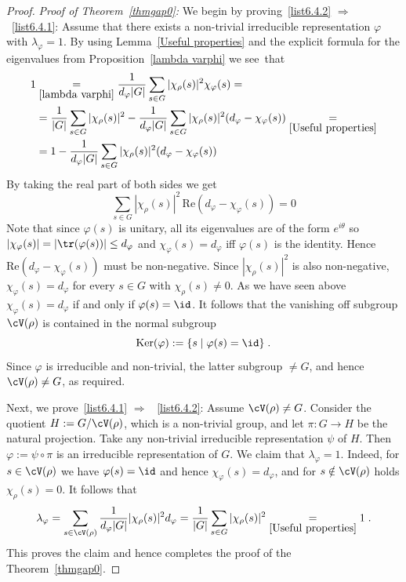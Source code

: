 \begin{proof}\emph{Proof of Theorem~\ref{thmgap0}:}
We begin by proving~\eqref{list6.4.2} $\Rightarrow$~\eqref{list6.4.1}: Assume that there exists a non-trivial irreducible representation $\varphi$ with $\lambda_\varphi = 1$. By using Lem\-ma~\ref{Useful properties} and the explicit formula for the eigenvalues from Proposition~\ref{lambda varphi} we see~that
\begin{equation*}
\begin{split}
1 & \underset{\ref{lambda varphi}}{=} \frac{1}{d_\varphi| G|} \sum_{s\in G} | \chi_\rho(s)|^2\chi_\varphi(s) = \\
& = \frac{1}{| G|} \sum_{s\in G} | \chi_\rho(s)|^2 - \frac{1}{d_\varphi| G|} \sum_{s\in G} | \chi_\rho(s)|^2 (d_\varphi - \chi_\varphi(s)) \underset{\ref{Useful properties}}{=} \\
& = 1 - \frac{1}{d_\varphi| G|} \sum_{s\in G} | \chi_\rho(s)|^2 (d_\varphi - \chi_\varphi(s))
\end{split}
\end{equation*}
By taking the real part of both sides we get
\[
\sum_{s\in G} | \chi_\rho(s) |^2\,\text{Re}(d_\varphi - \chi_\varphi(s)) = 0
\]
Note that since $\varphi(s)$ is unitary, all its eigenvalues are of the form $e^{i\theta}$ so $| \chi_\varphi (s) |\linebreak= | \tr(\varphi(s)) |\leq d_\varphi$ and $\chi_\varphi(s)=d_\varphi$ iff $\varphi(s)$ is the identity. Hence $\text{Re}(d_\varphi - \chi_\varphi(s))$ must be non-negative. Since $| \chi_\rho(s) |^2$ is also non-negative, $\chi_\varphi(s)=d_\varphi$ for every $s \in G$ with $\chi_\rho(s) \neq 0$. As we have seen above $\chi_\varphi(s)=d_\varphi$ if and only if $\varphi(s)=\id$. It follows that the vanishing off subgroup $\cV(\rho)$ is contained in the normal subgroup
\[
\text{Ker}(\varphi) := \{s\mid\varphi(s)=\id\}\;.
\]
Since $\varphi$ is irreducible and non-trivial, the latter subgroup
$\neq G$, and hence $\cV(\rho) \neq G$, as required.


Next, we prove~\eqref{list6.4.1} $\Rightarrow$~ \eqref{list6.4.2}: Assume $\cV(\rho)\not=G$. Consider the quotient $H:=G/\cV(\rho)$, which is a non-trivial group, and let $\pi: G \to H$ be the natural projection. Take any non-trivial irreducible representation $\psi$ of $H$. Then $\varphi:= \psi \circ \pi$ is an irreducible representation of $G$. We claim that $\lambda_\varphi=1$. Indeed, for $s \in \cV(\rho)$ we have $\varphi(s)=\id$ and hence $\chi_\varphi(s) = d_\varphi$, and for $s \notin \cV(\rho)$ holds $\chi_\rho(s) = 0$. It follows that
\begin{equation*}
\begin{split}
\lambda_{\varphi} = \sum_{s\in \cV(\rho)} \frac{1}{d_{\varphi} | G |} | \chi_\rho(s) |^2 d_{\varphi} = \frac{1}{| G |} \sum_{s\in G} | \chi_\rho(s) |^2 \underset{\ref{Useful properties}}{=} 1\;.
\end{split}
\end{equation*}
This proves the claim and hence completes the proof of the Theorem~\ref{thmgap0}.
\end{proof}

